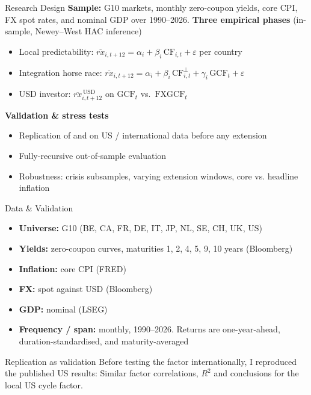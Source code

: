 \documentclass[10pt]{beamer}
\newcommand{\CF}{\mathrm{CF}}
\newcommand{\GCF}{\mathrm{GCF}}
\newcommand{\FXGCF}{\mathrm{FXGCF}}
\newcommand{\rxbar}{\overline{rx}}
\begin{document}
\begin{frame}{Research Design}
  \textbf{Sample:} G10 markets, monthly zero-coupon yields, core CPI, FX spot
  rates, and nominal GDP over 1990--2026.
  \vfill
  \textbf{Three empirical phases} (in-sample, Newey--West HAC inference)
  \begin{itemize}
    \item[\textbf{I}] Local predictability:
      $\rxbar_{i,t+12}=\alpha_i+\beta_i\,\CF_{i,t}+\varepsilon$ per country
    \item[\textbf{II}] Integration horse race:
      $\rxbar_{i,t+12}=\alpha_i+\beta_i\,\CF^{\perp}_{i,t}
        +\gamma_i\,\GCF_{t}+\varepsilon$
    \item[\textbf{III}] USD investor:
      $\rxbar^{\,\mathrm{USD}}_{i,t+12}$ on $\GCF_{t}$ vs.\ $\FXGCF_{t}$
  \end{itemize}
  \vfill
  \textbf{Validation \& stress tests}
  \begin{itemize}
    \item Replication of \citet{cieslak2015} and \citet{dahlquist2013} on US /
      international data before any extension
    \item Fully-recursive out-of-sample evaluation
      \citep[Campbell--Thompson $R^{2}_{\mathrm{oos}}$,][]{campbellthompson2008}
    \item Robustness: crisis subsamples, varying extension windows,
      core vs. headline inflation
  \end{itemize}
\end{frame}

\begin{frame}{Data \& Validation}
  \begin{itemize}
    \item \textbf{Universe:} G10 (BE, CA, FR, DE, IT, JP, NL, SE, CH, UK, US)
    \item \textbf{Yields:} zero-coupon curves, maturities 1, 2, 4, 5, 9, 10
      years (Bloomberg)
    \item \textbf{Inflation:} core CPI (FRED)
    \item \textbf{FX:}
      spot against USD (Bloomberg)
    \item \textbf{GDP:} nominal (LSEG)
    \item \textbf{Frequency / span:} monthly, 1990--2026. Returns are
      one-year-ahead, duration-standardised, and maturity-averaged
  \end{itemize}
  \vfill
  \begin{block}{Replication as validation}
    Before testing the factor internationally, I reproduced the published US results: Similar factor correlations, $R^2$ and conclusions for the local US cycle factor.
  \end{block}
\end{frame}
\end{document}
